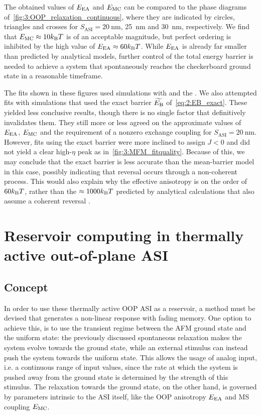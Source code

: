 The obtained values of $E_\mathrm{EA}$ and $E_\mathrm{MC}$ can be compared to the phase diagrams of~\cref{fig:3:OOP_relaxation_continuous}, where they are indicated by circles, triangles and crosses for $S_\mathrm{ASI} = \SI{20}{\nano\metre}$, \SI{25}{\nano\metre} and \SI{30}{\nano\metre}, respectively.
We find that $\EMC \approx 10 \kBT$ is of an acceptable magnitude, but perfect ordering is inhibited by the high value of $\EEA \approx 60 \kBT$.
While $E_\mathrm{EA}$ is already far smaller than predicted by analytical models, further control of the total energy barrier is needed to achieve a system that spontaneously reaches the checkerboard ground state in a reasonable timeframe. \\\par

The fits shown in these figures used \hotspice simulations with  and the .
We also attempted fits with simulations that used the exact barrier $\widetilde{E_\mathrm{B}}$ of~\cref{eq:2:EB_exact}.
These yielded less conclusive results, though there is no single factor that definitively invalidates them.
They still more or less agreed on the approximate values of $E_\mathrm{EA}$, $E_\mathrm{MC}$ and the requirement of a nonzero exchange coupling for $S_\mathrm{ASI} = \SI{20}{\nano\metre}$.
However, fits using the exact barrier were more inclined to assign $J < 0$ and did not yield a clear high-$\eta$ peak as in~\cref{fig:3:MFM_fitquality}.
Because of this, we may conclude that the exact barrier is less accurate than the mean-barrier model in this case, possibly indicating that reversal occurs through a non-coherent process.
This would also explain why the effective anisotropy is on the order of $60 \kBT$, rather than the $\approx 1000 \kBT$ predicted by analytical calculations that also assume a coherent reversal \cite[Supp.4]{KUR-24}.

\newpage
\section{Reservoir computing in thermally active out-of-plane ASI}
\subsection{Concept}
In order to use these thermally active OOP ASI as a reservoir, a method must be devised that generates a non-linear response with fading memory.
One option to achieve this, is to use the transient regime between the AFM ground state and the uniform state: the previously discussed spontaneous relaxation makes the system evolve towards the ground state, while an external stimulus can instead push the system towards the uniform state.
This allows the usage of analog input, i.e. a continuous range of input values, since the rate at which the system is pushed away from the ground state is determined by the strength of this stimulus.
The relaxation towards the ground state, on the other hand, is governed by parameters intrinsic to the ASI itself, like the OOP anisotropy $E_\mathrm{EA}$ and MS coupling $E_\mathrm{MC}$.


